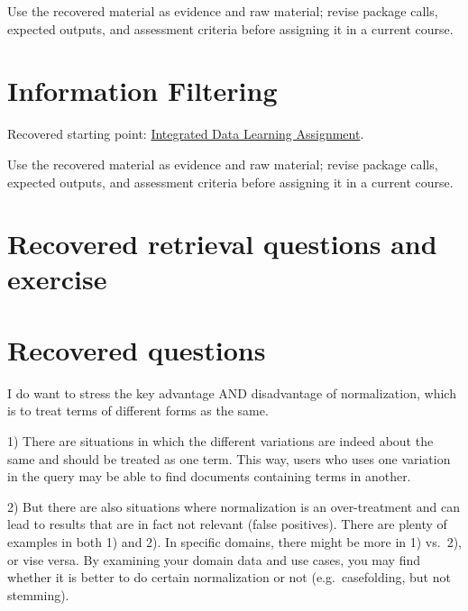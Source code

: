 \documentclass[
  letterpaper,
]{scrbook}
\begin{document}
Use the recovered material as evidence and raw material; revise package
calls, expected outputs, and assessment criteria before assigning it in
a current course.

\section*{Information Filtering}\label{sec-pr-12-information-filtering}


Recovered starting point:
\hyperref[sec-lab-integrated-learning-assignment]{Integrated Data
Learning Assignment}.

Use the recovered material as evidence and raw material; revise package
calls, expected outputs, and assessment criteria before assigning it in
a current course.

\section*{Recovered retrieval questions and
exercise}\label{sec-pr-12-recovered-exercise}


\section*{Recovered questions}\label{recovered-questions}


I do want to stress the key advantage AND disadvantage of normalization,
which is to treat terms of different forms as the same.

1) There are situations in which the different variations are indeed
about the same and should be treated as one term. This way, users who
uses one variation in the query may be able to find documents containing
terms in another.

2) But there are also situations where normalization is an
over-treatment and can lead to results that are in fact not relevant
(false positives). There are plenty of examples in both 1) and 2). In
specific domains, there might be more in 1) vs.~2), or vise versa. By
examining your domain data and use cases, you may find whether it is
better to do certain normalization or not (e.g.~casefolding, but not
stemming).
\end{document}
